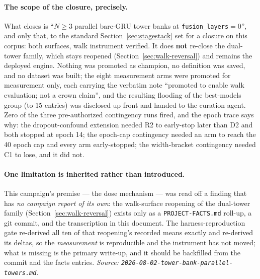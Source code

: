 \documentclass[11pt]{article}
\begin{document}
\paragraph{The scope of the closure, precisely.} What closes is
``$N\ge3$ parallel bare-GRU tower banks at \texttt{fusion\_layers}${}=0$'', and
only that, to the standard Section~\ref{sec:stagestack} set for a closure on this
corpus: both surfaces,
walk instrument verified. It does \textbf{not} re-close the dual-tower family,
which stays reopened (Section~\ref{sec:walk-reversal}) and remains the deployed
engine. Nothing was promoted as champion, no definition was saved, and no
dataset was built; the eight measurement arms were promoted for measurement only,
each carrying the verbatim note ``promoted to enable walk evaluation; not a crown
claim'', and the resulting flooding of the best-models group (to \num{15}
entries) was disclosed up front and handed to the curation agent. Zero of the
three pre-authorized contingency runs fired, and the epoch trace says why: the
dropout-confound extension needed R2 to early-stop later than D2 and both stopped
at epoch \num{14}; the epoch-cap contingency needed an arm to reach the \num{40}
epoch cap and every arm early-stopped; the width-bracket contingency needed C1 to
lose, and it did not.

\paragraph{One limitation is inherited rather than introduced.} This campaign's
premise --- the dose mechanism --- was read off a finding that has \emph{no
campaign report of its own}: the walk-surface reopening of the dual-tower family
(Section~\ref{sec:walk-reversal}) exists only as a \texttt{PROJECT-FACTS.md}
roll-up, a git commit, and the transcription in this document. The
harness-reproduction gate re-derived all ten of that reopening's recorded means
exactly and re-derived its deltas, so the \emph{measurement} is reproducible and
the instrument has not moved; what is missing is the primary write-up, and it
should be backfilled from the commit and the facts entries.
\emph{Source: \texttt{2026-08-02-tower-bank-parallel-towers.md}.}
\end{document}
